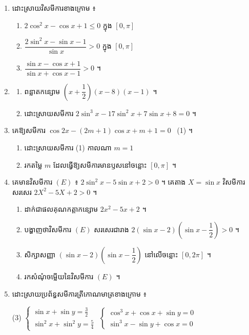 \begin{enumerate}[1]
\begin{tasks}
  \end{tasks}
  \item ដោះស្រាយវិសមីការខាងក្រោម ៖
  \begin{enumerate}[a]
    \item $2\cos^2 x - \cos x + 1 \le 0$ ក្នុង $[0, \pi]$
    \item $\dfrac{2\sin^2 x - \sin x - 1}{\sin x} > 0$ ក្នុង $[0, \pi]$
    \item $\dfrac{\sin x - \cos x + 1}{\sin x + \cos x - 1} > 0$ ។
  \end{enumerate}
  \item
  \begin{enumerate}[a]
    \item ពន្លាតកន្សោម $\left(x + \dfrac{1}{2}\right)(x - 8)(x - 1)$ ។
    \item ដោះស្រាយសមីការ $2\sin^3 x - 17\sin^2 x + 7\sin x + 8 = 0$ ។
  \end{enumerate}
  \item គេឱ្យសមីការ $\cos 2x - (2m + 1)\cos x + m + 1 = 0$ \ (1) ។
  \begin{enumerate}[a]
    \item ដោះស្រាយសមីការ (1) កាលណា $m = 1$
    \item រកតម្លៃ $m$ ដែលធ្វើឱ្យសមីការមានឫសនៅចន្លោះ $[0, \pi]$ ។
  \end{enumerate}
  \item គេមានវិសមីការ $(E)$ ៖ $2\sin^2 x - 5\sin x + 2 > 0$ ។ គេតាង $X = \sin x$ វិសមីការសរសេរ $2X^2 - 5X + 2 > 0$ ។
  \begin{enumerate}[a]
    \item ដាក់ជាផលគុណកត្តាកន្សោម $2x^2 - 5x + 2$ ។
    \item បង្ហាញថាវិសមីការ $(E)$ សរសេរជារាង $2(\sin x - 2)\left(\sin x - \dfrac{1}{2}\right) > 0$ ។
    \item សិក្សាសញ្ញា $(\sin x - 2)\left(\sin x - \dfrac{1}{2}\right)$ នៅលើចន្លោះ $[0, 2\pi]$ ។
    \item រកសំណុំចម្លើយនៃវិសមីការ $(E)$ ។
  \end{enumerate}
  \item ដោះស្រាយប្រព័ន្ធសមីការត្រីកោណមាត្រខាងក្រោម ៖
  \begin{tasks}(3)
    \task $\begin{cases} \sin x + \sin y = \frac{3}{2}\\ \sin^2 x + \sin^2 y = \frac{5}{4} \end{cases}$
    \task $\begin{cases} \cos^3 x + \cos x + \sin y = 0\\ \sin^3 x - \sin y + \cos x = 0 \end{cases}$

\end{tasks}
\end{enumerate}
